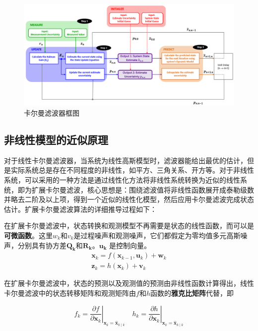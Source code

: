 \documentclass{article}
\begin{document}
\begin{figure}[ht]
    \centering
   \includegraphics[scale=0.45]{imgs/DetailedKalmanFilterAlgorithm.png}
    \caption{卡尔曼滤波器框图}
    \label{fig:KalmanFilter}
\end{figure}

\subsection{非线性模型的近似原理}
对于线性卡尔曼滤波器，当系统为线性高斯模型时，滤波器能给出最优的估计，但是实际系统总是存在不同程度的非线性，如平方、三角关系、开方等。对于非线性系统，可以采用的一种方法是通过线性化方法将非线性系统转换为近似的线性系统，即为扩展卡尔曼滤波，核心思想是：围绕滤波值将非线性函数展开成泰勒级数并略去二阶及以上项，得到一个近似的线性化模型\cite{julier2004unscented}，然后应用卡尔曼滤波完成状态估计。扩展卡尔曼滤波算法的详细推导过程\cite{CKF}如下：

在扩展卡尔曼滤波中，状态转换和观测模型不再需要是状态的线性函数，而可以是\textbf{可微函数}。这里${w}_{k}$和${v}_{k}$是过程噪声和观测噪声，它们都假定为零均值多元高斯噪声，分别具有协方差$\mathbf{Q_k}$和$\mathbf{R_k}$。$\mathbf{u_k}$ 是控制向量。
\begin{equation*}
\begin{array}{l}
\mathbf{x}_{k}=f\left(\mathbf{x}_{k-1}, \mathbf{u}_{k}\right)+\mathbf{w}_{k} \\
\mathbf{z}_{k}=h\left(\mathbf{x}_{k}\right)+\mathbf{v}_{k}
\end{array}
\end{equation*}

在扩展卡尔曼滤波中，状态的预测以及观测值的预测由非线性函数计算得出，线性卡尔曼滤波中的状态转移矩阵和观测矩阵由$f$和$h$函数的\textbf{雅克比矩阵}代替，即

\begin{equation*}
f_{k}=\left.\frac{\partial f}{\partial \mathbf{x}_{k}}\right|_{\mathbf{x}_{k}=\mathbf{\hat x}_{k \mid k}}\quad
h_{k} = \left.\frac{\partial h}{\partial \mathbf{x}_{k}}\right|_{\mathbf{x}_{k}=\mathbf{\hat x}_{k \mid k}}
\end{equation*}
\end{document}

